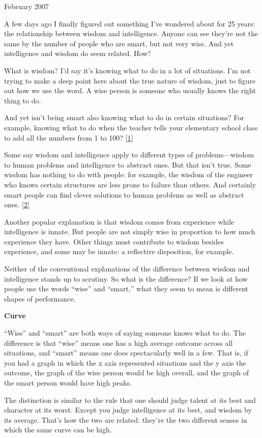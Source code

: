 February 2007

A few days ago I finally figured out something I've wondered about for
25 years: the relationship between wisdom and intelligence. Anyone can
see they're not the same by the number of people who are smart, but not
very wise. And yet intelligence and wisdom do seem related. How?

What is wisdom? I'd say it's knowing what to do in a lot of situations.
I'm not trying to make a deep point here about the true nature of
wisdom, just to figure out how we use the word. A wise person is someone
who usually knows the right thing to do.

And yet isn't being smart also knowing what to do in certain situations?
For example, knowing what to do when the teacher tells your elementary
school class to add all the numbers from 1 to 100?
{[}\hyperref[f1n]{1}{]}

Some say wisdom and intelligence apply to different types of
problems---wisdom to human problems and intelligence to abstract ones.
But that isn't true. Some wisdom has nothing to do with people: for
example, the wisdom of the engineer who knows certain structures are
less prone to failure than others. And certainly smart people can find
clever solutions to human problems as well as abstract ones.
{[}\hyperref[f2n]{2}{]}

Another popular explanation is that wisdom comes from experience while
intelligence is innate. But people are not simply wise in proportion to
how much experience they have. Other things must contribute to wisdom
besides experience, and some may be innate: a reflective disposition,
for example.

Neither of the conventional explanations of the difference between
wisdom and intelligence stands up to scrutiny. So what is the
difference? If we look at how people use the words ``wise'' and
``smart,'' what they seem to mean is different shapes of performance.

\textbf{Curve}

``Wise'' and ``smart'' are both ways of saying someone knows what to do.
The difference is that ``wise'' means one has a high average outcome
across all situations, and ``smart'' means one does spectacularly well
in a few. That is, if you had a graph in which the x axis represented
situations and the y axis the outcome, the graph of the wise person
would be high overall, and the graph of the smart person would have high
peaks.

The distinction is similar to the rule that one should judge talent at
its best and character at its worst. Except you judge intelligence at
its best, and wisdom by its average. That's how the two are related:
they're the two different senses in which the same curve can be high.

